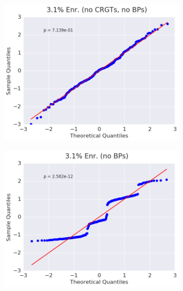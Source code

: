 \begin{figure}[h!]
\centering
\begin{subfigure}{0.5\textwidth}
  \centering
  \includegraphics[width=\linewidth]{figures/patterns/assm-3.1-inf/quantile/assm-31-inf-capt-1}
  \caption{}
  \label{fig:chap9-qq-assm-3.1-inf-capt}
\end{subfigure}%
\begin{subfigure}{0.5\textwidth}
  \centering
  \includegraphics[width=\linewidth]{figures/patterns/assm-3.1/quantile/assm-31-capt-1}
  \caption{}
  \label{fig:chap9-qq-assm-3.1-capt}
\end{subfigure}
\begin{subfigure}{0.5\textwidth}

\end{subfigure}
\end{figure}
